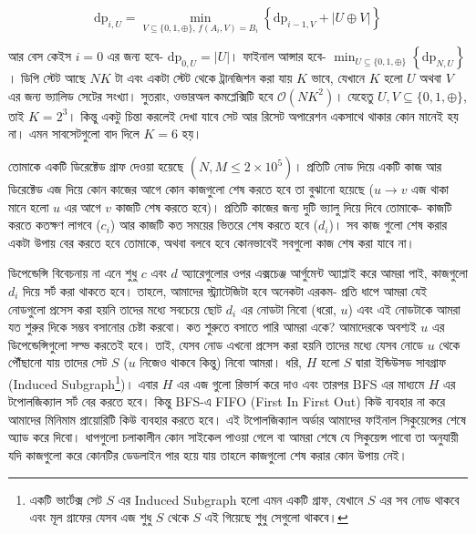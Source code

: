 \begin{solution}
\begin{equation*}
\text{dp}_{i,U} = \min_{V \subseteq \{0, 1, \oplus\},\, f(A_i, V) = B_i} \left \{ \text{dp}_{i-1, V} + |U \oplus V| \right \}
\end{equation*}

আর বেস কেইস $i=0$ এর জন্য হবে- $\text{dp}_{0, U} = |U|$। ফাইনাল আন্সার হবে- $\min_{U \subseteq \{0, 1, \oplus\}} \left \{ \text{dp}_{N,U} \right \}$। ডিপি স্টেট আছে $NK$ টা এবং একটা স্টেট থেকে ট্রানজিশন করা যায় $K$ ভাবে, যেখানে $K$ হলো $U$ অথবা $V$ এর জন্য ভ্যালিড সেটের সংখ্যা। সুতরাং, ওভারঅল কমপ্লেক্সিটি হবে $\mathcal{O}(NK^2)$। যেহেতু $U, V \subseteq \{0, 1, \oplus\}$, তাই $K = 2^3$। কিন্তু একটু চিন্তা করলেই দেখা যাবে সেট আর রিসেট অপারেশন একসাথে থাকার কোন মানেই হয় না। এমন সাবসেটগুলো বাদ দিলে $K=6$ হয়।
\end{solution}

\begin{problem}
তোমাকে একটি ডিরেক্টেড গ্রাফ দেওয়া হয়েছে $(N, M \le 2\times 10^5)$। প্রতিটি নোড দিয়ে একটি কাজ আর ডিরেক্টেড এজ দিয়ে কোন কাজের আগে কোন কাজগুলো শেষ করতে হবে তা বুঝানো হয়েছে ($u \rightarrow v$ এজ থাকা মানে হলো $u$ এর আগে $v$ কাজটি শেষ করতে হবে)। প্রতিটি কাজের জন্য দুটি ভ্যালু দিয়ে দিবে তোমাকে- কাজটি করতে কতক্ষণ লাগবে ($c_i$) আর কাজটি কত সময়ের ভিতরে শেষ করতে হবে ($d_i$)। সব কাজ গুলো শেষ করার একটা উপায় বের করতে হবে তোমাকে, অথবা বলবে হবে কোনভাবেই সবগুলো কাজ শেষ করা যাবে না।
\end{problem}
\begin{solution}
ডিপেন্ডেন্সি বিবেচনায় না এনে শুধু $c$ এবং $d$ অ্যারেগুলোর ওপর এক্সচেঞ্জ আর্গুমেন্ট অ্যাপ্লাই করে আমরা পাই, কাজগুলো $d_i$ দিয়ে সর্ট করা থাকতে হবে। তাহলে, আমাদের স্ট্র্যাটেজিটা হবে অনেকটা এরকম- 	প্রতি ধাপে আমরা যেই নোডগুলো প্রসেস করা হয়নি তাদের মধ্যে সবচেয়ে ছোট $d_i$ এর নোডটা নিবো (ধরো, $u$) এবং এই নোডটাকে আমরা যত শুরুর দিকে সম্ভব বসানোর চেষ্টা করবো। কত শুরুতে বসাতে পারি আমরা একে? আমাদেরকে অবশ্যই $u$ এর ডিপেন্ডেন্সিগুলো সল্ভ করতেই হবে। তাই, যেসব নোড এখনো প্রসেস করা হয়নি তাদের মধ্যে যেসব নোডে $u$ থেকে পৌঁছানো যায় তাদের সেট $S$ ($u$ নিজেও থাকবে কিন্তু) নিবো আমরা। 	ধরি, $H$ হলো $S$ দ্বারা ইন্ডিউসড সাবগ্রাফ (Induced Subgraph\footnote{একটি ভার্টেক্স সেট $S$ এর Induced Subgraph হলো এমন একটি গ্রাফ, যেখানে $S$ এর সব নোড থাকবে এবং মূল গ্রাফের যেসব এজ শুধু $S$ থেকে $S$ এই গিয়েছে শুধু সেগুলো থাকবে।})। এবার $H$ এর এজ গুলো রিভার্স করে দাও এবং তারপর BFS এর মাধ্যমে $H$ এর টপোলজিক্যাল সর্ট বের করতে হবে। কিন্তু BFS-এ FIFO (First In First Out) কিউ ব্যবহার না করে আমাদের মিনিমাম প্রায়োরিটি কিউ ব্যবহার করতে হবে। এই টপোলজিক্যাল অর্ডার আমাদের ফাইনাল সিকুয়েন্সের শেষে অ্যাড করে দিবো। ধাপগুলো চলাকালীন কোন সাইকেল পাওয়া গেলে বা আমরা শেষে যে সিকুয়েন্স পাবো তা অনুযায়ী যদি কাজগুলো করে কোনটির ডেডলাইন পার হয়ে যায় তাহলে কাজগুলো শেষ করার কোন উপায় নেই।
\end{solution}

